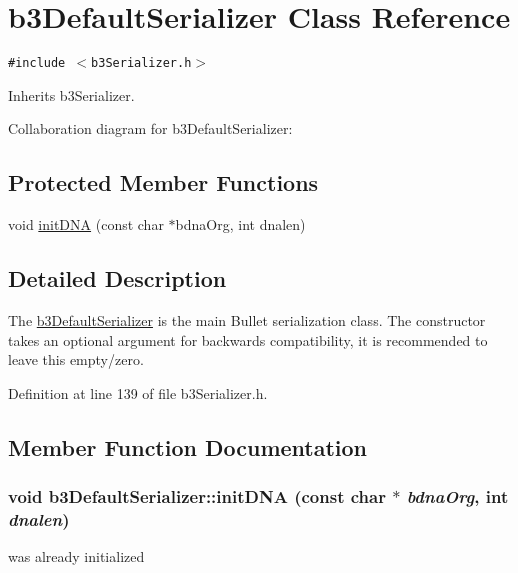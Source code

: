 \hypertarget{classb3_default_serializer}{
\section{b3DefaultSerializer Class Reference}
\label{classb3_default_serializer}
}
{\tt \#include $<$b3Serializer.h$>$}

Inherits b3Serializer.

Collaboration diagram for b3DefaultSerializer:\subsection*{Protected Member Functions}
\begin{CompactItemize}
\item 
void \hyperlink{classb3_default_serializer_9444bead16f644f135bdfc54c3b93fca}{initDNA} (const char $\ast$bdnaOrg, int dnalen)
\end{CompactItemize}


\subsection{Detailed Description}
The \hyperlink{classb3_default_serializer}{b3DefaultSerializer} is the main Bullet serialization class. The constructor takes an optional argument for backwards compatibility, it is recommended to leave this empty/zero. 

Definition at line 139 of file b3Serializer.h.

\subsection{Member Function Documentation}
\hypertarget{classb3_default_serializer_9444bead16f644f135bdfc54c3b93fca}{
\subsubsection[initDNA]{\setlength{\rightskip}{0pt plus 5cm}void b3DefaultSerializer::initDNA (const char $\ast$ {\em bdnaOrg}, \/  int {\em dnalen})}}
\label{classb3_default_serializer_9444bead16f644f135bdfc54c3b93fca}




was already initialized 

